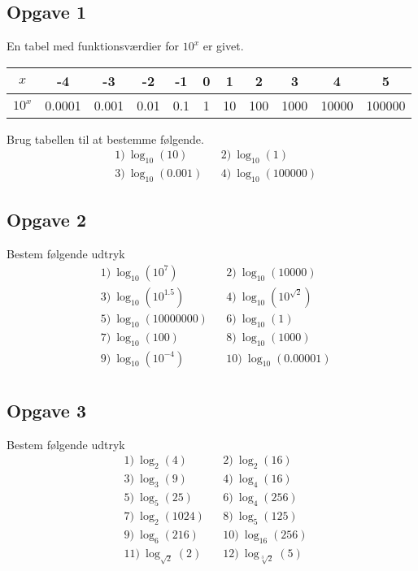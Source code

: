 \subsection*{Opgave 1}
En tabel med funktionsværdier for $10^x$ er givet.
\begin{table}[H]
	\centering
	\begin{tabular}{c|c|c|c|c|c|c|c|c|c|c}
		$x$ & -4 & -3 & -2 & -1 & 0 & 1 & 2 & 3 & 4 & 5 \\
		\hline
		$10^x$ & 0.0001 & 0.001 & 0.01& 0.1 & 1 & 10 & 100 & 1000 & 10000 & 100000
	\end{tabular}
\end{table}
Brug tabellen til at bestemme følgende.
\begin{align*}
	&1) \ \log_{10}(10)     &&2) \ \log_{10}(1)    \\
	&3) \ \log_{10}(0.001)     &&4) \  \log_{10}(100000)   
\end{align*}


\subsection*{Opgave 2}
Bestem følgende udtryk 
\begin{align*}
	&1) \ \log_{10}(10^7)    &&2) \ \log_{10}(10000)   \\  
	&3) \ \log_{10}(10^{1.5})   &&4) \ \log_{10}(10^{\sqrt{2}})     \\  
	&5) \ \log_{10}(10000000)   &&6) \ \log_{10}(1)   \\  
	&7) \ \log_{10}(100)			&&8) \ \log_{10}(1000)  \\
	&9) \ \log_{10}(10^{-4})     &&10) \ \log_{10}(0.00001) \\ 
\end{align*}

\subsection*{Opgave 3}
Bestem følgende udtryk
\begin{align*}
	&1) \ \log_2(4) &    &2) \ \log_2(16) \\
	&3) \ \log_3(9) &    &4) \ \log_4(16) \\
	&5) \ \log_5(25) &    &6) \ \log_4(256) \\
	&7) \ \log_2(1024) &    &8) \ \log_5(125) \\
	&9) \ \log_6(216) &    &10) \ \log_{16}(256) \\
	&11) \ \log_{\sqrt{2}}(2) &    &12) \ \log_{\sqrt[3]{2}}(5) \\
\end{align*}

